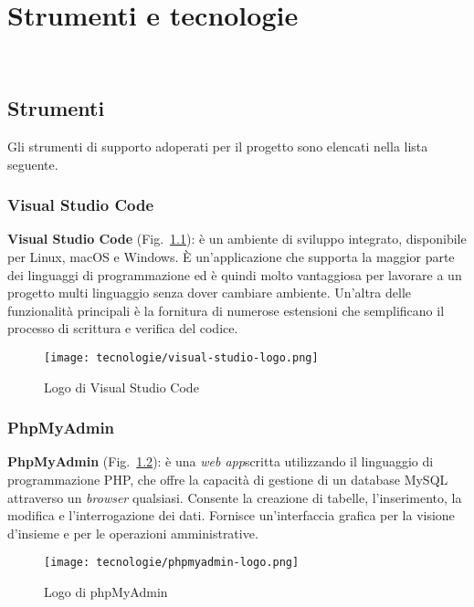\chapter{Strumenti e tecnologie}
\label{cap:strumenti-tecnologie}

\\

\section{Strumenti}
\label{sec:strumenti}
Gli strumenti di supporto adoperati per il progetto sono elencati nella lista seguente.

\subsection{Visual Studio Code}
\textbf{Visual Studio Code} (Fig.~\ref{fig:logo-vscode}): è un ambiente di sviluppo integrato, disponibile per Linux, macOS e Windows. 
È un'applicazione che supporta la maggior parte dei linguaggi di programmazione ed è quindi molto vantaggiosa per lavorare a un progetto multi linguaggio senza dover cambiare ambiente.
Un'altra delle funzionalità principali è la fornitura di numerose estensioni che semplificano il processo di scrittura e verifica del codice.

\begin{figure}[!h] 
    \centering 
    \texttt{[image: tecnologie/visual-studio-logo.png]} 
    \caption{Logo di Visual Studio Code}
    \label{fig:logo-vscode}
  \end{figure}

\newpage

\subsection{PhpMyAdmin}
\textbf{PhpMyAdmin} (Fig.~\ref{fig:logo-phpmyadmin}): è una \emph{\gls{web app}}\glsfirstoccur scritta utilizzando il linguaggio di programmazione PHP, che offre la capacità di gestione di un database MySQL attraverso un \emph{browser} qualsiasi. Consente la creazione di tabelle, l'inserimento, la modifica e l'interrogazione dei dati.
Fornisce un'interfaccia grafica per la visione d'insieme e per le operazioni amministrative.

\begin{figure}[!h] 
      \centering 
      \texttt{[image: tecnologie/phpmyadmin-logo.png]} 
      \caption{Logo di phpMyAdmin}
    \label{fig:logo-phpmyadmin}
  \end{figure}

